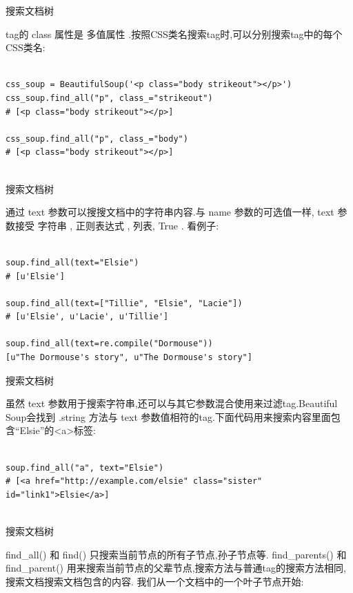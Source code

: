 \documentclass{beamer}
\begin{document}
\begin{frame}[t,fragile]{搜索文档树}

tag的 class 属性是 多值属性 .按照CSS类名搜索tag时,可以分别搜索tag中的每个CSS类名:
\scriptsize

\begin{verbatim}

css_soup = BeautifulSoup('<p class="body strikeout"></p>')
css_soup.find_all("p", class_="strikeout")
# [<p class="body strikeout"></p>]

css_soup.find_all("p", class_="body")
# [<p class="body strikeout"></p>]


\end{verbatim}


\end{frame}

\begin{frame}[t,fragile]{搜索文档树}

通过 text 参数可以搜搜文档中的字符串内容.与 name 参数的可选值一样, text 参数接受 字符串 , 正则表达式 , 列表, True . 看例子:

\scriptsize
\begin{verbatim}

soup.find_all(text="Elsie")
# [u'Elsie']

soup.find_all(text=["Tillie", "Elsie", "Lacie"])
# [u'Elsie', u'Lacie', u'Tillie']

soup.find_all(text=re.compile("Dormouse"))
[u"The Dormouse's story", u"The Dormouse's story"]

\end{verbatim}

\end{frame}


\begin{frame}[t,fragile]{搜索文档树}

虽然 text 参数用于搜索字符串,还可以与其它参数混合使用来过滤tag.Beautiful Soup会找到 .string 方法与 text 参数值相符的tag.下面代码用来搜索内容里面包含“Elsie”的<a>标签:

\begin{verbatim}

soup.find_all("a", text="Elsie")
# [<a href="http://example.com/elsie" class="sister" id="link1">Elsie</a>]


\end{verbatim}


\end{frame}

\begin{frame}[t]{搜索文档树}

find\_all() 和 find() 只搜索当前节点的所有子节点,孙子节点等. find\_parents() 和 find\_parent() 用来搜索当前节点的父辈节点,搜索方法与普通tag的搜索方法相同,搜索文档搜索文档包含的内容. 我们从一个文档中的一个叶子节点开始:

\end{frame}
\end{document}
